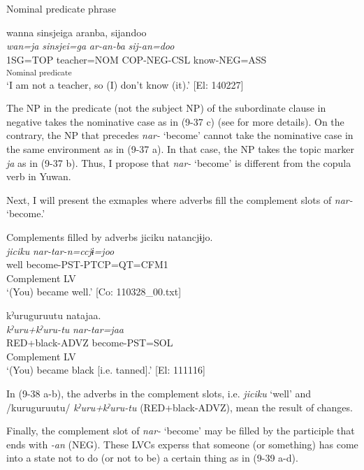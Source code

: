 \exi{}  Nominal predicate phrase

\ex \label{ex:9.37c} %
    \gllll  wanna  sinsjeiga  aranba,  sijandoo\\
       \textit{wan=ja}  \textit{sinsjei=ga}  \textit{ar-an-ba}  \textit{sij-an=doo}\\
       1SG=TOP  teacher=NOM  COP-NEG-CSL  know-NEG=ASS\\
        [NP  Copula verb]\textsubscript{Nominal predicate}  \\
      \glt        ‘I am not a teacher, so (I) don’t know (it).’ [El: 140227]
    \z
\z

The NP in the predicate (not the subject NP) of the subordinate clause in negative takes the nominative case as in (9-37 c) (see  for more details). On the contrary, the NP that precedes \textit{nar-} ‘become’ cannot take the nominative case in the same environment as in (9-37 a). In that case, the NP takes the topic marker \textit{ja} as in (9-37 b). Thus, I propose that \textit{nar-} ‘become’ is different from the copula verb in Yuwan.

  Next, I will present the exmaples where adverbs fill the complement slots of \textit{nar-} ‘become.’

\ea   Complements filled by adverbs \label{ex:9.38}
\ea \label{ex:9.38a}%
 \gllll  jiciku  natancjɨjo.\\
      \textit{jiciku}  \textit{nar{}-tar-n=ccjɨ=joo}\\
      well  become-PST-PTCP=QT=CFM1\\
      Complement  LV\\
      \glt       ‘(You) became well.’ [Co: 110328\_00.txt]

\ex \label{ex:9.38b} %
    \gllll  kˀuruguruutu  natajaa.  \\
      \textit{kˀuru+kˀuru-tu}  \textit{nar{}-tar=jaa} \\
      RED+black-ADVZ  become-PST=SOL  \\
      Complement  LV  \\
      \glt       ‘(You) became black [i.e. tanned].’ [El: 111116]
    \z
\z

In (9-38 a-b), the adverbs in the complement slots, i.e. \textit{jiciku} ‘well’ and /kuruguruutu/ \textit{kˀuru+kˀuru-tu} (RED+black-ADVZ), mean the result of changes.

Finally, the complement slot of \textit{nar-} ‘become’ may be filled by the participle that ends with \textit{{}-an} (NEG). These LVCs experss that someone (or something) has come into a state not to do (or not to be) a certain thing as in (9-39 a-d).

